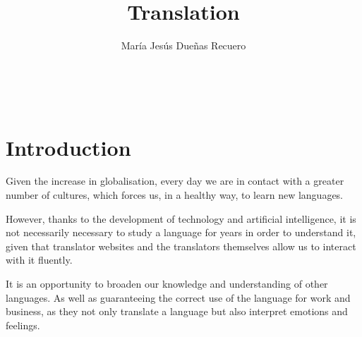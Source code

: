 \documentclass[a4paper]{article}
\title{Translation}
\author{María Jesús Dueñas Recuero}
\date{

 \\ \texttt{MJesus.duenas1@alu.uclm.es}\\[2ex]%
}
\theoremstyle{plain}
\theoremstyle{definition}
\begin{document}
	\maketitle
	\newpage
	\
	\tableofcontents
	\newpage
	\section{Introduction}
	\label{sec:intro}
	\begin{flushleft}
	Given the increase in globalisation, every day we are in contact with a greater number of cultures, which forces us, in a healthy way, to learn new languages.

	However, thanks to the development of technology and artificial intelligence, it is not necessarily necessary to study a language for years in order to understand it, given that translator websites and the translators themselves allow us to interact with it fluently.

	It is an opportunity to broaden our knowledge and understanding of other languages. As well as guaranteeing the correct use of the language for work and business, as they not only translate a language but also interpret emotions and feelings.
	
    \end{flushleft}
	
	


	
	
\end{document}
